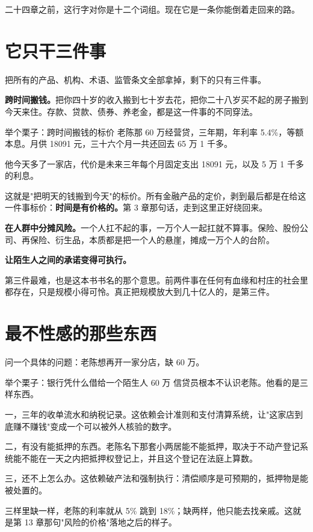 二十四章之前，这行字对你是十二个词组。现在它是一条你能倒着走回来的路。

\section{它只干三件事}

把所有的产品、机构、术语、监管条文全部拿掉，剩下的只有三件事。

\textbf{跨时间搬钱。}把你四十岁的收入搬到七十岁去花，把你二十八岁买不起的房子搬到今天来住。存款、贷款、债券、养老金，都是这一件事的不同穿法。

\begin{egbox}{举个栗子：跨时间搬钱的标价}
老陈那 60 万经营贷，三年期，年利率 5.4\%，等额本息。月供 18091 元，三十六个月一共还回去 65 万 1 千多。

他今天多了一家店，代价是未来三年每个月固定支出 18091 元，以及 5 万 1 千多的利息。

这就是"把明天的钱搬到今天"的标价。所有金融产品的定价，剥到最后都是在给这一件事标价：\textbf{时间是有价格的。}第 3 章那句话，走到这里正好绕回来。

\end{egbox}

\textbf{在人群中分摊风险。}一个人扛不起的事，一万个人一起扛就不算事。保险、股份公司、再保险、衍生品，本质都是把一个人的悬崖，摊成一万个人的台阶。

\textbf{让陌生人之间的承诺变得可执行。}

第三件最难，也是这本书书名的那个意思。前两件事在任何有血缘和村庄的社会里都存在，只是规模小得可怜。真正把规模放大到几十亿人的，是第三件。

\section{最不性感的那些东西}

问一个具体的问题：老陈想再开一家分店，缺 60 万。

\begin{egbox}{举个栗子：银行凭什么借给一个陌生人 60 万}
信贷员根本不认识老陈。他看的是三样东西。

一，三年的收单流水和纳税记录。这依赖会计准则和支付清算系统，让"这家店到底赚不赚钱"变成一个可以被外人核验的数字。

二，有没有能抵押的东西。老陈名下那套小两居能不能抵押，取决于不动产登记系统能不能在一天之内把抵押权登记上，并且这个登记在法庭上算数。

三，还不上怎么办。这依赖破产法和强制执行：清偿顺序是可预期的，抵押物是能被处置的。

三样里缺一样，老陈的利率就从 5\% 跳到 18\%；缺两样，他只能去找亲戚。这就是第 13 章那句"风险的价格"落地之后的样子。

\end{egbox}

